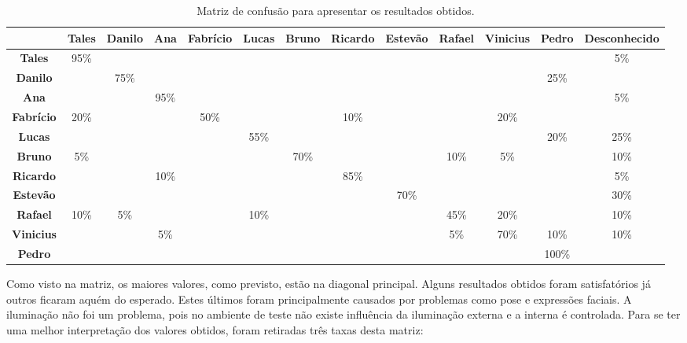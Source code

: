	\begin{landscape}
	\begin{table}[htb]
		\begin{center}
			\caption{Matriz de confusão para apresentar os resultados obtidos.}
			\label{tab:matriz-confusao}
			\begin{tabular}{|c|c|c|c|c|c|c|c|c|c|c|c|c|}
				\hline  & \bf Tales & \bf Danilo & \bf Ana & \bf Fabrício & \bf Lucas & \bf Bruno & \bf Ricardo & \bf Estevão & \bf Rafael & \bf Vinicius & \bf Pedro & \bf Desconhecido\\
				\hline \bf Tales 		& 95\% & 			& 		 & 			&   	 & 			& 		 & 			& 		 & 			& 		 & 5\%	\\
				\hline \bf Danilo 	& 		 & 75\% & 		 & 			&   	 & 			& 		 & 			& 		 & 			& 25\% &		 	\\
				\hline \bf Ana 			& 		 & 			& 95\% & 			&   	 & 			& 		 & 			& 		 & 			& 		 & 5\%  \\
				\hline \bf Fabrício & 20\% & 			& 		 & 50\% &      & 			& 10\% & 			&  	   & 20\% & 		 &		  \\
				\hline \bf Lucas 		& 		 & 			& 		 & 			& 55\% & 			& 		 & 			& 		 & 			& 20\% & 25\% \\
				\hline \bf Bruno 		& 5\%	 & 			& 		 & 			& 		 & 70\% & 		 & 			& 10\% & 	5\%	& 		 & 10\%	\\
				\hline \bf Ricardo 	& 		 & 			& 10\% & 			& 		 & 			& 85\% & 			& 		 & 			& 		 & 5\%  \\
				\hline \bf Estevão 	& 		 & 			& 		 & 			& 		 & 			& 		 & 70\% & 		 & 			& 		 & 30\% \\
				\hline \bf Rafael 	& 10\% & 	5\%	& 		 & 			& 10\% & 			& 		 & 			& 45\% & 20\% & 		 & 10\% \\
				\hline \bf Vinicius & 		 & 			& 5\%  & 			& 		 & 			& 		 & 			& 5\%  & 70\% & 10\% & 10\% \\
				\hline \bf Pedro 		& 		 & 			& 		 & 			& 		 & 			& 		 & 			& 		 & 			& 100\%&		  \\
				\hline
			\end{tabular}
		\end{center}
	\end{table}
	\end{landscape}

	Como visto na matriz, os maiores valores, como previsto, estão na diagonal
	principal. Alguns resultados obtidos foram satisfatórios já outros ficaram
	aquém do esperado. Estes últimos foram principalmente causados por problemas como pose e expressões faciais. A iluminação não foi um problema,
	pois no ambiente de teste não existe influência da iluminação externa e a
	interna é controlada. Para se ter uma melhor interpretação dos valores obtidos,
	foram retiradas três taxas desta matriz:

